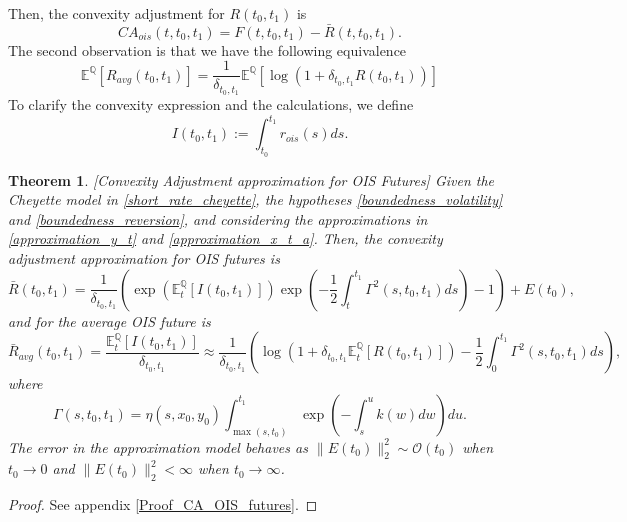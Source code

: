 \documentclass[a4paper,10pt]{article}
\newtheorem{theorem}{Theorem}[section]
\newcommand{\1}{\mathbf{1}}
\begin{document}
Then, the convexity adjustment for $ R(t_0,t_1)$ is
\begin{equation}\label{R_ois_ca}
CA_{ois}(t,t_0,t_1) = F(t,t_0,t_1) - \bar{R}(t,t_0,t_1).
\end{equation}
The second observation is that we have the following equivalence
\begin{equation}\label{R_ois_avg}
\mathbb{E}^{\mathbb{Q}}\left[R_{avg}(t_0,t_1) \right] =\frac{1}{\delta_{t_0,t_1}} \mathbb{E}^{\mathbb{Q}}\left[ \log\left(1+ \delta_{t_0,t_1} R(t_0,t_1) \right) \right]  \end{equation}
To clarify the convexity expression and the calculations, we define 
\begin{equation*}
I(t_0,t_1) := \int_{t_0}^{t_1} r_{ois}(s) ds.
\end{equation*}

\begin{theorem}\label{Th_CA_OIS}[Convexity Adjustment approximation for OIS Futures]
Given the Cheyette model in \eqref{short_rate_cheyette}, the hypotheses \ref{boundedness_volatility} and \ref{boundedness_reversion}, and considering the approximations in \eqref{approximation_y_t} and \eqref{approximation_x_t_a}. Then, the convexity adjustment approximation for OIS futures is 
\begin{equation}\label{convexity_ois_future}
\bar{R}(t_0,t_1) = \frac{1}{\delta_{t_0,t_1}}\left(\exp\left(\mathbb{E}_t^{\mathbb{Q}}\left[I(t_0,t_1)\right]\right)\exp\left(-\frac{1}{2}\int_{t}^{t_1}\Gamma^{2}(s,t_0,t_1) ds\right) - 1\right) + E(t_0),
\end{equation}
and for the average OIS future is
\begin{equation}\label{convexity_avg_ois_future}
\bar{R}_{avg}(t_0,t_1) = \frac{\mathbb{E}_t^{\mathbb{Q}}\left[I(t_0,t_1)\right] }{\delta_{t_0,t_1}} \approx \frac{1}{\delta_{t_0,t_1}}\left(\log\left(1+\delta_{t_0,t_1}  \mathbb{E}_t^{\mathbb{Q}}\left[R(t_0,t_1)\right] \right) - \frac{1}{2}\int_{0}^{t_1}  \Gamma^{2}(s,t_0,t_1) ds\right),
\end{equation}
where 
\begin{equation}
\Gamma(s,t_0,t_1)= \eta(s,x_0,y_0)\int_{\max(s, t_{0})}^{t_1} \exp\left( -\int_{s}^{u} k(w) dw\right)du.
\end{equation}
The error in the approximation model behaves as $\|E(t_0)\|^{2}_{2} \sim \mathcal{O}(t_0)$ when $t_0 \to 0$ and $\|E(t_0)\|^{2}_{2} < \infty$ when $t_0 \to \infty$.
\end{theorem}
\begin{proof}
See appendix \ref{Proof_CA_OIS_futures}.
\end{proof}
\end{document}
